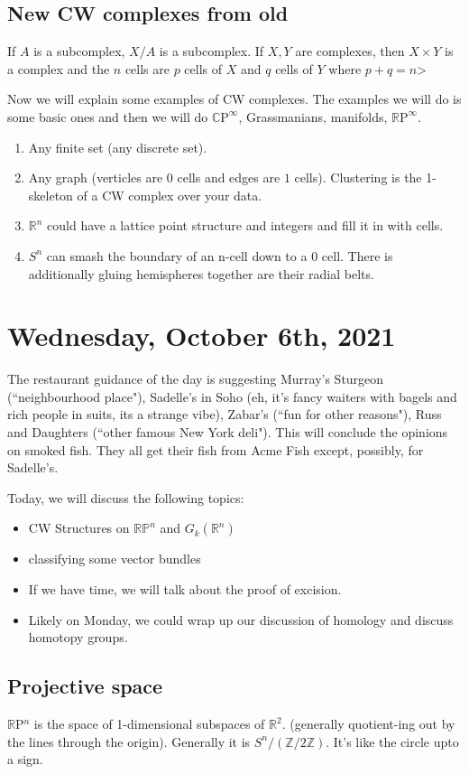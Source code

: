 \documentclass[10pt]{article}
\theoremstyle{definition}
\begin{document}
	\subsection{New CW complexes from old}
	If $A$ is a subcomplex, $X/A$ is a subcomplex.  If $X, Y$ are complexes, then $X\times Y$ is a complex and the $n$ cells are $p$ cells of $X$ and $q$ cells of $Y$ where $p+q=n$> 
	
	Now we will explain some examples of CW complexes.  The examples we will do is some basic ones and then we will do $\mathbb{C}\text{P}^\infty$, Grassmanians, manifolds, $\mathbb{R}\text{P}^\infty$. 
	\begin{enumerate}
		\item Any finite set (any discrete set). 
		\item Any graph (verticles are $0$ cells and edges are $1$ cells). Clustering is the 1-skeleton of a CW complex over your data.
		\item $\mathbb{R}^n$ could have a lattice point structure and integers and fill it in with cells. 
		\item $S^n$ can smash the boundary of an n-cell down to a $0$ cell. There is additionally gluing hemispheres together are their radial belts. 
	\end{enumerate}
	\section{Wednesday, October 6th, 2021}
		The restaurant guidance of the day is suggesting Murray's Sturgeon (``neighbourhood place"), Sadelle's in Soho (eh, it's fancy waiters with bagels and rich people in suits, its a strange vibe), Zabar's (``fun for other reasons"), Russ and Daughters (``other famous New York deli"). This will conclude the opinions on smoked fish. They all get their fish from Acme Fish except, possibly, for Sadelle's.
	
	Today, we will discuss the following topics:
	\begin{itemize}
		\item CW Structures on $\mathbb{RP}^n$ and $G_k(\mathbb{R}^n)$ 
		\item classifying some vector bundles
		\item If we have time, we will talk about the proof of excision. 
		\item Likely on Monday, we could wrap up our discussion of homology and discuss homotopy groups. 
	\end{itemize}
	\subsection{Projective space}
	$\mathbb{R}$P$^n$ is the space of 1-dimensional subspaces of $\mathbb{R}^2$. (generally quotient-ing out by the lines through the origin). Generally it is $S^n/(\mathbb{Z}/2\mathbb{Z})$. It's like the circle upto a sign.
	
\end{document}
